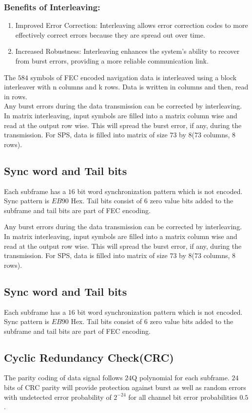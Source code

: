 \subsubsection{Benefits of Interleaving:}
\begin{enumerate}
    \item Improved Error Correction: Interleaving allows error correction codes to more effectively correct errors because they are spread out over time.
    \item Increased Robustness: Interleaving enhances the system's ability to recover from burst errors, providing a more reliable communication link.
\end{enumerate}
The $584$ symbols of FEC encoded navigation data  is interleaved using a block interleaver with n columns and k rows. Data is written in columns and then, read in rows.
\\
Any burst errors during the data transmission can be corrected by interleaving. In matrix interleaving, input symbols are filled into a matrix column wise and read at the output row wise. This will spread the burst error, if any, during the transmission. For SPS, data is filled into matrix of size $73$ by $8$($73$ columns, $8$ rows).
\subsection{Sync word and Tail bits}
Each subframe has a $16$ bit word synchronization pattern which is not encoded. Sync pattern is $EB90$ Hex. Tail bits consist of $6$ zero value bits added to the subframe and tail bits are part of FEC encoding. 

Any burst errors during the data transmission can be corrected by interleaving. In matrix interleaving, input symbols are filled into a matrix column wise and read at the output row wise. This will spread the burst error, if any, during the transmission. For SPS, data is filled into matrix of size $73$ by $8$($73$ columns, $8$ rows).
\subsection{Sync word and Tail bits}
Each subframe has a $16$ bit word synchronization pattern which is not encoded. Sync pattern is $EB90$ Hex. Tail bits consist of $6$ zero value bits added to the subframe and tail bits are part of FEC encoding. 

\subsection{Cyclic Redundancy Check(CRC)}
The parity coding of data signal follows $24$Q polynomial for each subframe. $24$ bits of CRC parity will provide protection against burst as well as random errors with undetected error probability of $2^{-24}$ for all channel bit error probabilities $0.5$.

